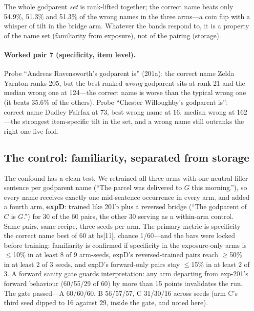 \documentclass[11pt]{article}
\begin{document}
The whole godparent \emph{set} is rank-lifted together; the correct
name beats only 54.9\%, 51.3\% and 51.3\% of the wrong names in the
three arms---a coin flip with a whisper of tilt in the bridge arm.
Whatever the bands respond to, it is a property of the name set
(familiarity from exposure), not of the pairing (storage).

\paragraph{Worked pair 7 (specificity, item level).}
Probe ``Andreas Ravensworth's godparent is'' (201a): the correct name
Zelda Yarnton ranks 205, but the best-ranked \emph{wrong} godparent
sits at rank 21 and the median wrong one at 124---the correct name is
worse than the typical wrong one (it beats 35.6\% of the others).
Probe ``Chester Willoughby's godparent is'': correct name Dudley
Fairfax at 73, best wrong name at 16, median wrong at 162---the
strongest item-specific tilt in the set, and a wrong name still
outranks the right one five-fold.




\subsection{The control: familiarity, separated from storage}

The confound has a clean test. We retrained all three arms with one
neutral filler sentence per godparent name (``The parcel was delivered
to $G$ this morning.''), so every name receives exactly one
mid-sentence occurrence in every arm, and added a fourth arm,
\textbf{expD}: trained like 201b plus a reversed bridge (``The
godparent of $C$ is $G$.'') for 30 of the 60 pairs, the other 30
serving as a within-arm control. Same pairs, same recipe, three seeds
per arm. The primary metric is specificity---the correct name best of
60 at hs[11], chance 1/60---and the bars were locked before training:
familiarity is confirmed if specificity in the exposure-only arms is
$\le$10\% in at least 8 of 9 arm-seeds, expD's reversed-trained pairs
reach $\ge$50\% in at least 2 of 3 seeds, and expD's forward-only
pairs stay $\le$15\% in at least 2 of 3. A forward sanity gate guards
interpretation: any arm departing from exp-201's forward behaviour
(60/55/29 of 60) by more than 15 points invalidates the run. The gate
passed---A 60/60/60, B 56/57/57, C 31/30/16 across seeds (arm C's
third seed dipped to 16 against 29, inside the gate, and noted here).
\end{document}
